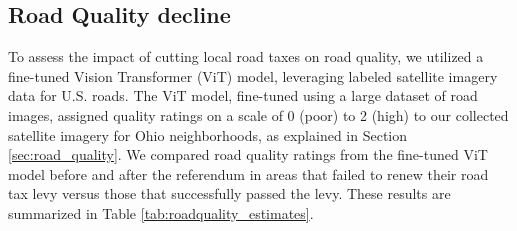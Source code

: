 



\subsection{Road Quality decline} \label{sec:road_quality_decline}

 To assess the impact of cutting local road taxes on road quality, we utilized a fine-tuned Vision Transformer (ViT) model, leveraging labeled satellite imagery data for U.S. roads. The ViT model, fine-tuned using a large dataset of road images, assigned quality ratings on a scale of 0 (poor) to 2 (high) to our collected satellite imagery for Ohio neighborhoods, as explained in Section \ref{sec:road_quality}. We compared road quality ratings from the fine-tuned ViT model before and after the referendum in areas that failed to renew their road tax levy versus those that successfully passed the levy. These results are summarized in Table \ref{tab:roadquality_estimates}. 


